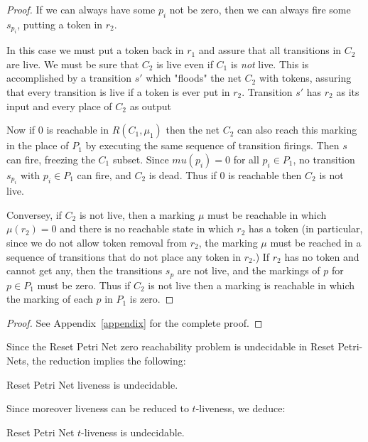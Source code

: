 \begin{proof}
If we can always have some $p_i$ not be zero, then we can always fire some $s_{p_i}$, putting a token in $r_2$.

In this case we must put a token back in $r_1$ and assure that all transitions in $C_2$ are live.
We must be sure that $C_2$ is live even if $C_1$ is {\em not} live.
This is accomplished by a transition $s'$ which  "floods" the net $C_2$ with tokens, assuring that every transition is live if a token is ever put in $r_2$.
Transition $s'$ has $r_2$ as its input and every place of $C_2$ as output

Now if $0$ is reachable
in $R(C_1, \mu_1)$ 
then the net $C_2$ can also reach this marking
in the place of $P_1$ by executing the same sequence of transition firings.
Then $s$ can fire, freezing the $C_1$ subset.
Since $mu(p_i) = 0$ for all $p_i \in P_1$, no transition $s_{p_i}$ with $p_i \in P_1$ can fire, and $C_2$ is dead.
Thus if $0$ is reachable then $C_2$ is not live.

Conversey, if $C_2$ is not live, then a marking $\mu$ must be reachable in which 
$\mu(r_2) = 0$ and there is no reachable state in which $r_2$ has a token
(in particular, since we do not allow token removal from $r_2$, the marking $\mu$ must be reached in a sequence of transitions that do not place any token in $r_2$.)
If $r_2$ has no token and cannot get any, then the transitions $s_p$ are not live, and the markings of $p$ for $p \in P_1$ must be zero. 
Thus if $C_2$ is not live then a marking is reachable in which the marking of each $p$ in $P_1$ is zero. 

\end{proof}
\fi

\begin{proof}
See Appendix~\ref{appendix} for the complete proof.
\end{proof}


Since the Reset Petri Net zero reachability problem is undecidable in Reset Petri-Nets, the reduction implies the following:

\begin{corollary}
Reset Petri Net liveness is undecidable.
\end{corollary}

Since moreover liveness can be reduced to 
$t$-liveness, we deduce:

\begin{corollary}
Reset Petri Net $t$-liveness is undecidable.
\end{corollary}

